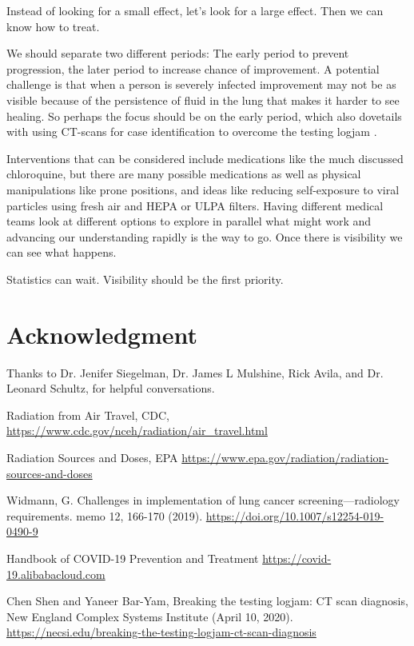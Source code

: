 \documentclass[onecolumn,journal]{IEEEtran}
\begin{document}
\begin{multicols}{2}

Instead of looking for a small effect, let's look for a large effect. Then we can know how to treat. 

We should separate two different periods: The early period to prevent progression, the later period to increase chance of improvement. A potential challenge is that when a person is severely infected improvement may not be as visible because of the persistence of fluid in the lung that makes it harder to see healing. So perhaps the focus should be on the early period, which also dovetails with using CT-scans for case identification to overcome the testing logjam \cite{china,cttest}.

Interventions that can be considered include medications like the much discussed chloroquine, but there are many possible medications as well as physical manipulations like prone positions, and ideas like reducing self-exposure to viral particles using fresh air and HEPA or ULPA filters. Having different medical teams look at different options to explore in parallel what might work and advancing our understanding rapidly is the way to go. Once there is visibility we can see what happens. 

Statistics can wait. Visibility should be the first priority. 

\section*{Acknowledgment}
Thanks to Dr. Jenifer Siegelman, Dr. James L Mulshine, Rick Avila, and Dr. Leonard Schultz, for helpful conversations.

\end{multicols}
\begin{thebibliography}{20}

 Radiation from Air Travel, CDC, \url{https://www.cdc.gov/nceh/radiation/air_travel.html}

 Radiation Sources and Doses, EPA \url{https://www.epa.gov/radiation/radiation-sources-and-doses}

 Widmann, G. Challenges in implementation of lung cancer screening---radiology requirements. memo 12, 166-170 (2019). \url{https://doi.org/10.1007/s12254-019-0490-9}

  Handbook of COVID-19 Prevention and Treatment \url{https://covid-19.alibabacloud.com}

 Chen Shen and Yaneer Bar-Yam, Breaking the testing logjam: CT scan diagnosis, New England Complex Systems Institute (April 10, 2020). \url{https://necsi.edu/breaking-the-testing-logjam-ct-scan-diagnosis}

\end{thebibliography}
% 
\end{document}
